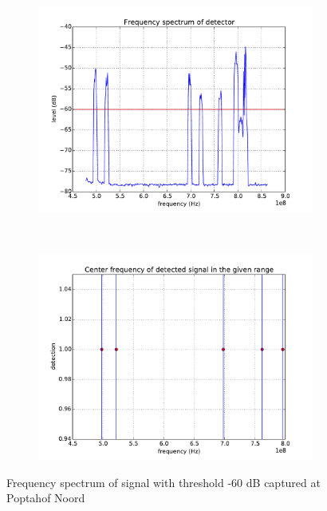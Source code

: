 \begin{figure}[H]
    \centering
    \begin{subfigure}[b]{0.45\textwidth}
        \includegraphics[width=\textwidth]{figures/popta-60-freq}
    \end{subfigure}
    ~ %
    \begin{subfigure}[b]{0.45\textwidth}
        \includegraphics[width=\textwidth]{figures/popta-60-center}
    \end{subfigure}
    \caption{Frequency spectrum of signal with threshold -60 dB captured at Poptahof Noord}\label{fig:popta-freq-60}
\end{figure}

